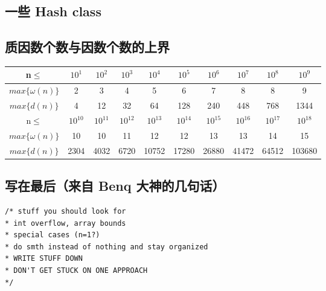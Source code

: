 \documentclass[12pt]{article}
\begin{document}
\subsection{一些 Hash class}



\subsection{质因数个数与因数个数的上界}

\begin{table}[!ht]
	\centering
	\begin{tabular}{|c|c|c|c|c|c|c|c|c|c|}
		\hline
		n$\le$ & $10^{1}$ & $10^{2}$ & $10^{3}$ & $10^{4}$ & $10^{5}$ & $10^{6}$ & $10^{7}$ & $10^{8}$ & $10^{9}$ \\ \hline
		$max\{\omega(n)\}$ & 2 & 3 & 4 & 5 & 6 & 7 & 8 & 8 & 9 \\ \hline
		$max\{d(n)\}$ & 4 & 12 & 32 & 64 & 128 & 240 & 448 & 768 & 1344 \\ \hline
		n$\le$ & $10^{10}$ & $10^{11}$ & $10^{12}$ & $10^{13}$ & $10^{14}$ & $10^{15}$ & $10^{16}$ & $10^{17}$ & $10^{18}$ \\ \hline
		$max\{\omega(n)\}$ & 10 & 10 & 11 & 12 & 12 & 13 & 13 & 14 & 15 \\ \hline
		$max\{d(n)\}$ & 2304 & 4032 & 6720 & 10752 & 17280 & 26880 & 41472 & 64512 & 103680 \\ \hline
	\end{tabular}
\end{table}

\subsection{写在最后（来自 Benq 大神的几句话）}

\begin{lstlisting}[style=C++]
/* stuff you should look for
* int overflow, array bounds
* special cases (n=1?)
* do smth instead of nothing and stay organized
* WRITE STUFF DOWN
* DON'T GET STUCK ON ONE APPROACH
*/
\end{lstlisting}
\end{document}

